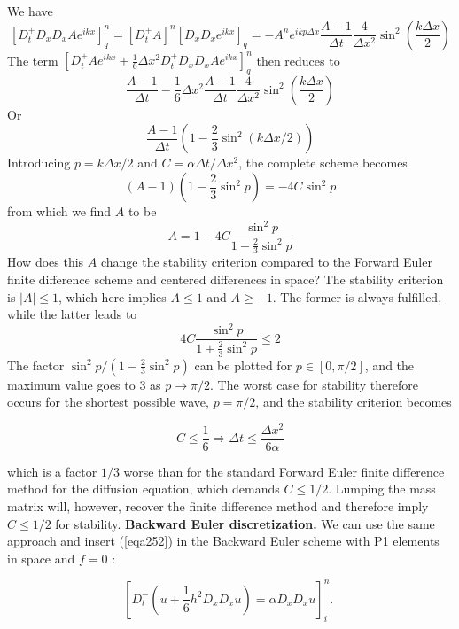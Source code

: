 \documentclass[../main.tex]{subfiles}
\begin{document}
		We have
		$$
		\left[D_{t}^{+} D_{x} D_{x} A e^{i k x}\right]_{q}^{n}=\left[D_{t}^{+} A\right]^{n}\left[D_{x} D_{x} e^{i k x}\right]_{q}=-A^{n} e^{i k p \Delta x} \frac{A-1}{\Delta t} \frac{4}{\Delta x^{2}} \sin ^{2}\left(\frac{k \Delta x}{2}\right)
		$$
		The term $\left[D_{t}^{+} A e^{i k x}+\frac{1}{6} \Delta x^{2} D_{t}^{+} D_{x} D_{x} A e^{i k x}\right]_{q}^{n}$ then reduces to
		$$
		\frac{A-1}{\Delta t}-\frac{1}{6} \Delta x^{2} \frac{A-1}{\Delta t} \frac{4}{\Delta x^{2}} \sin ^{2}\left(\frac{k \Delta x}{2}\right)
		$$
		Or
		$$
		\frac{A-1}{\Delta t}\left(1-\frac{2}{3} \sin ^{2}(k \Delta x / 2)\right)
		$$
		Introducing $p=k \Delta x / 2$ and $C=\alpha \Delta t / \Delta x^{2}$, the complete scheme becomes
		$$
		(A-1)\left(1-\frac{2}{3} \sin ^{2} p\right)=-4 C \sin ^{2} p
		$$
		from which we find $A$ to be
		$$
		A=1-4 C \frac{\sin ^{2} p}{1-\frac{2}{3} \sin ^{2} p}
		$$\smallbreak 
		How does this $A$ change the stability criterion compared to the Forward Euler finite difference scheme and centered differences in space? The stability criterion is $|A| \leq 1$, which here implies $A \leq 1$ and $A \geq-1$. The former is always fulfilled, while the latter leads to
		$$
		4 C \frac{\sin ^{2} p}{1+\frac{2}{3} \sin ^{2} p} \leq 2
		$$
		The factor $\sin ^{2} p /\left(1-\frac{2}{3} \sin ^{2} p\right)$ can be plotted for $p \in[0, \pi / 2]$, and the maximum value goes to 3 as $p \rightarrow \pi / 2$. The worst case for stability therefore occurs for the shortest possible wave, $p=\pi / 2$, and the stability criterion becomes

	\begin{equation}
	\label{eqa254}
		C \leq \frac{1}{6} \Rightarrow \Delta t \leq \frac{\Delta x^{2}}{6 \alpha}
	\end{equation}

		\noindent which is a factor $1 / 3$ worse than for the standard Forward Euler finite difference method for the diffusion equation, which demands $C \leq 1 / 2$. Lumping the mass matrix will, however, recover the finite difference method and therefore imply $C \leq 1 / 2$ for stability.\bigbreak
		\noindent \textbf{Backward Euler discretization.   } We can use the same approach and insert (\ref{eqa252}) in the Backward Euler scheme with P1 elements in space and $f=0$ :

	\begin{equation}
		\label{eqa255}
		\left[D_{t}^{-}\left(u+\frac{1}{6} h^{2} D_{x} D_{x} u\right)=\alpha D_{x} D_{x} u\right]_{i}^{n} \text {. }
	\end{equation}
\end{document}

